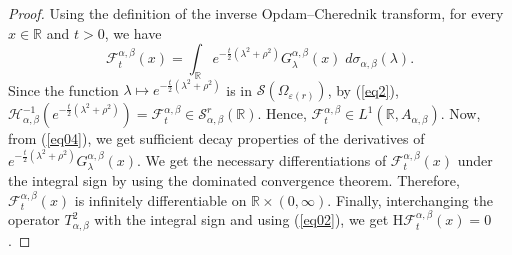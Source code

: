\documentclass[a4paper,11pt, reqno]{amsart}
\theoremstyle{plain}
\theoremstyle{definition}
\theoremstyle{remark}
\def \R{{\mathbb R}}
\def\R{\mathbb R}
\def \S{{\mathcal S}}
\def \H{{\mathcal H}}
\begin{document}
\begin{proof}
Using the definition of the inverse Opdam--Cherednik transform, for every $x \in \mathbb{R}$ and $t>0$, we have 
\[ \mathcal{F}_t^{\alpha, \beta} (x) = \int_{\R} e^{-\frac{t}{2}\left( \lambda^2 + \rho^2 \right)} G^{\alpha, \beta}_\lambda(x)\; d\sigma_{\alpha, \beta}(\lambda). \] 
Since the function $\lambda \mapsto e^{-\frac{t}{2}\left( \lambda^2 + \rho^2 \right)}$ is in $\S\left(\Omega_{\varepsilon(r)}\right)$, by (\ref{eq2}), $\H_{\alpha, \beta}^{-1} \left( e^{-\frac{t}{2}\left( \lambda^2 + \rho^2 \right)} \right) = \mathcal{F}_t^{\alpha, \beta} \in \S^r_{\alpha, \beta} (\mathbb{R})$. Hence, $\mathcal{F}_t^{\alpha, \beta} \in L^1(\R, A_{\alpha, \beta})$. Now, from (\ref{eq04}), we get sufficient decay properties of the derivatives of $e^{-\frac{t}{2}\left( \lambda^2 + \rho^2 \right)} G^{\alpha, \beta}_\lambda(x)$. We get the necessary differentiations of $\mathcal{F}_t^{\alpha, \beta} (x)$ under the integral sign by using the dominated convergence theorem. Therefore, $\mathcal{F}_t^{\alpha, \beta} (x)$ is infinitely differentiable on $\mathbb{R} \times (0, \infty)$. Finally, interchanging the operator $T^2_{\alpha, \beta}$ with the integral sign and using (\ref{eq02}), we get $\mathrm{H} \mathcal{F}_t^{\alpha, \beta} (x) = 0$. 
\end{proof} 
\end{document}
